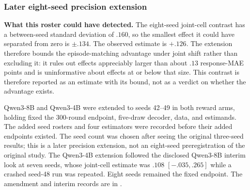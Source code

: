 \begin{center}
\begin{minipage}{\linewidth}
\centering
{}
\label{tab:exp3-coin-cues}
\scriptsize
\setlength{\tabcolsep}{3pt}
\resizebox{\linewidth}{!}{}
\end{minipage}
\end{center}

\begin{center}
\begin{minipage}{\linewidth}
\centering
{}
\label{tab:exp3-coin-diagnostics}
\scriptsize
\setlength{\tabcolsep}{3pt}
\resizebox{\linewidth}{!}{}
\end{minipage}
\end{center}


\subsubsection{Later eight-seed precision extension}

\noindent\textbf{What this roster could have detected.} The eight-seed
joint-cell contrast has a between-seed standard deviation of $.160$, so the
smallest effect it could have separated from zero is $\pm.134$. The observed
estimate is $+.126$. The extension therefore bounds the episode-matching
advantage under joint shift rather than excluding it: it rules out effects
appreciably larger than about $.13$ response-MAE points and is uninformative
about effects at or below that size. This contrast is therefore reported as an
estimate with its bound, not as a verdict on whether the advantage exists.
\label{app:exp3-eight-seed}

Qwen3-8B and Qwen3-4B were extended to seeds 42--49 in both reward arms, holding
fixed the 300-round endpoint, five-draw decoder, data, and estimands. The added
seed rosters and four estimators were recorded before their added endpoints
existed. The seed count was chosen after seeing the original three-seed results;
this is a later precision extension, not an eight-seed preregistration of the
original study. The Qwen3-4B extension followed the disclosed Qwen3-8B interim
look at seven seeds, whose joint-cell estimate was $.108$ $[-.035,.265]$ while
a crashed seed-48 run was repeated. Eight seeds remained the fixed endpoint.
The amendment and interim records are in
.

